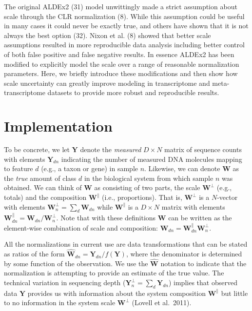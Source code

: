 \documentclass[
]{article}
\begin{document}
The original ALDEx2 (31) model unwittingly made a strict assumption
about scale through the CLR normalization (8). While this assumption
could be useful in many cases it could never be exactly true, and others
have shown that it is not always the best option (32). Nixon et al. (8)
showed that better scale assumptions resulted in more reproducible data
analysis including better control of both false positive and false
negative results. In essence ALDEx2 has been modified to explicitly
model the scale over a range of reasonable normalization parameters.
Here, we briefly introduce these modifications and then show how scale
uncertainty can greatly improve modeling in transcriptome and
meta-transcriptome datasets to provide more robust and reproducible
results.

\section{Implementation}\label{implementation}

To be concrete, we let \(\mathbf{Y}\) denote the \emph{measured}
\(D \times N\) matrix of sequence counts with elements
\(\mathbf{Y}_{dn}\) indicating the number of measured DNA molecules
mapping to feature \(d\) (e.g., a taxon or gene) in sample \(n\).
Likewise, we can denote \(\mathbf{W}\) as the \emph{true} amount of
class \(d\) in the biological system from which sample \(n\) was
obtained. We can think of \(\mathbf{W}\) as consisting of two parts, the
scale \(\mathbf{W}^{\perp}\) (e.g., totals) and the composition
\(\mathbf{W}^{\parallel}\) (i.e., proportions). That is,
\(\mathbf{W}^{\perp}\) is a \(N\)-vector with elements
\(\mathbf{W}^{\perp}_{n}=\sum_{d}\mathbf{W}_{dn}\) while
\(\mathbf{W}^{\parallel}\) is a \(D \times N\) matrix with elements
\(\mathbf{W}^{\parallel}_{dn}=\mathbf{W}_{dn}/\mathbf{W}^{\perp}_{n}\).
Note that with these definitions \(\mathbf{W}\) can be written as the
element-wise combination of scale and composition:
\(\mathbf{W}_{dn}=\mathbf{W}^{\parallel}_{dn}\mathbf{W}^{\perp}_{n}\).

All the normalizations in current use are data transformations that can
be stated as ratios of the form
\(\hat{{\mathbf{W}}}_{dn}=\mathbf{Y}_{dn}/f(\mathbf{Y})\), where the
denominator is determined by some function of the observation. We use
the \(\hat{{\mathbf{W}}}\) notation to indicate that the normalization
is attempting to provide an estimate of the true value. The technical
variation in sequencing depth
(\(\mathbf{Y}^{\perp}_{n}=\sum_{d}\mathbf{Y}_{dn}\)) implies that
observed data \(\mathbf{Y}\) provides us with information about the
system composition \(\mathbf{W}^{\parallel}\) but little to no
information in the system scale \(\mathbf{W}^{\perp}\) (Lovell et
al.~2011).
\end{document}
